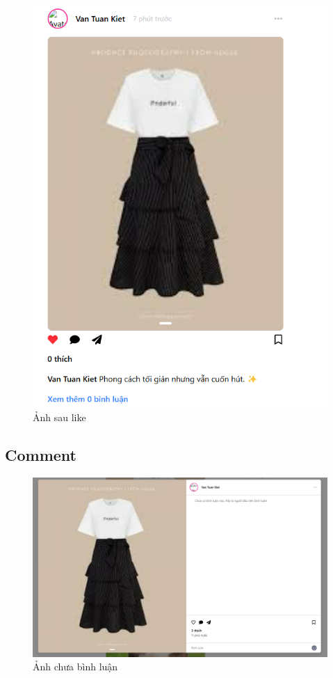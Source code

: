 \begin{figure}[H]
    \centering
    \includegraphics[width=1\textwidth]{img/instagram/like.png}
    \caption{Ảnh sau like}
\end{figure}

\FloatBarrier %

\subsection{Comment} 
\begin{figure}[H]
    \centering
    \includegraphics[width=1\textwidth]{img/instagram/chua_binh_luan.png}
    \caption{Ảnh chưa bình luận}
\end{figure}

